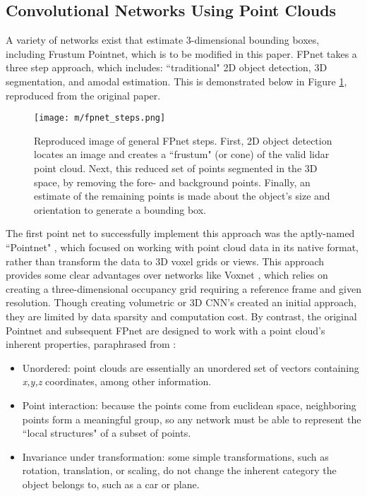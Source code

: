 \subsection{Convolutional Networks Using Point Clouds}
A variety of networks exist that estimate 3-dimensional bounding boxes, including Frustum Pointnet, which is to be modified in this paper. FPnet takes a three step approach, which includes: ``traditional" 2D object detection, 3D segmentation, and amodal estimation. This is demonstrated below in Figure \ref{FpGenSteps}, reproduced from the original paper.
\begin{figure}[ht] %
    \texttt{[image: m/fpnet\_steps.png]}
    \label{FpGenSteps}
    \caption{Reproduced image of general FPnet steps. First, 2D object detection locates an image and creates a ``frustum" (or cone) of the valid lidar point cloud. Next, this reduced set of points segmented in the 3D space, by removing the fore- and background points. Finally, an estimate of the remaining points is made about the object's size and orientation to generate a bounding box.}
\end{figure}


The first point net to successfully implement this approach was the aptly-named ``Pointnet" \cite{qi2017pointnet}, which focused on working with point cloud data in its native format, rather than transform the data to 3D voxel grids or views. This approach provides some clear advantages over networks like Voxnet \cite{maturana2015voxnet}, which relies on creating a three-dimensional occupancy grid requiring a reference frame and given resolution. Though creating volumetric or 3D CNN's created an initial approach, they are limited by data sparsity and computation cost. By contrast, the original Pointnet and subsequent FPnet are designed to work with a point cloud's inherent properties, paraphrased from \cite{qi2017pointnet}: 
\begin{itemize} \itemsep=-0.5em
    \item Unordered: point clouds are essentially an unordered set of vectors containing \textit{x,y,z} coordinates, among other information.
    \item Point interaction: because the points come from euclidean space, neighboring points form a meaningful group, so any network must be able to represent the ``local structures" of a subset of points.
    \item Invariance under transformation: some simple transformations, such as rotation, translation, or scaling, do not change the inherent category the object belongs to, such as a car or plane.
\end{itemize}


